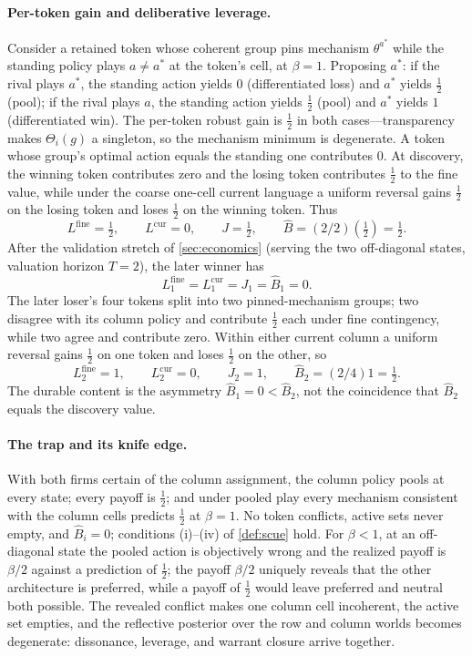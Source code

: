 \documentclass[11pt]{article}
\theoremstyle{definition}
\begin{document}
\paragraph{Per-token gain and deliberative leverage.}
Consider a retained token whose coherent group pins mechanism $\theta^{a^{*}}$ while the standing policy plays $a\neq a^{*}$ at the token's cell, at $\beta=1$.
Proposing $a^{*}$: if the rival plays $a^{*}$, the standing action yields $0$ (differentiated loss) and $a^{*}$ yields $\tfrac12$ (pool); if the rival plays $a$, the standing action yields $\tfrac12$ (pool) and $a^{*}$ yields $1$ (differentiated win).
The per-token robust gain is $\tfrac12$ in both cases---transparency makes $\Theta_i(g)$ a singleton, so the mechanism minimum is degenerate.
A token whose group's optimal action equals the standing one contributes $0$.
At discovery, the winning token contributes zero and the losing token contributes $\tfrac12$ to the fine value, while under the coarse one-cell current language a uniform reversal gains $\tfrac12$ on the losing token and loses $\tfrac12$ on the winning token.
Thus
\[
L^{\mathrm{fine}}=\tfrac12,\qquad
L^{\mathrm{cur}}=0,\qquad
J=\tfrac12,\qquad
\widehat B=(2/2)(\tfrac12)=\tfrac12.
\]
After the validation stretch of \cref{sec:economics} (serving the two off-diagonal states, valuation horizon $T=2$), the later winner has
\[
L_1^{\mathrm{fine}}
=
L_1^{\mathrm{cur}}
=
J_1
=
\widehat B_1
=0.
\]
The later loser's four tokens split into two pinned-mechanism groups; two disagree with its column policy and contribute $\tfrac12$ each under fine contingency, while two agree and contribute zero.
Within either current column a uniform reversal gains $\tfrac12$ on one token and loses $\tfrac12$ on the other, so
\[
L_2^{\mathrm{fine}}=1,\qquad
L_2^{\mathrm{cur}}=0,\qquad
J_2=1,\qquad
\widehat B_2=(2/4)1=\tfrac12.
\]
The durable content is the asymmetry $\widehat B_1=0<\widehat B_2$, not the coincidence that $\widehat B_2$ equals the discovery value.

\paragraph{The trap and its knife edge.}
With both firms certain of the column assignment, the column policy pools at every state; every payoff is $\tfrac12$; and under pooled play every mechanism consistent with the column cells predicts $\tfrac12$ at $\beta=1$.
No token conflicts, active sets never empty, and $\widehat B_i=0$; conditions (i)--(iv) of \cref{def:scue} hold.
For $\beta<1$, at an off-diagonal state the pooled action is objectively wrong and the realized payoff is $\beta/2$ against a prediction of $\tfrac12$; the payoff $\beta/2$ uniquely reveals that the other architecture is preferred, while a payoff of $\tfrac12$ would leave preferred and neutral both possible.
The revealed conflict makes one column cell incoherent, the active set empties, and the reflective posterior over the row and column worlds becomes degenerate: dissonance, leverage, and warrant closure arrive together.
\end{document}
